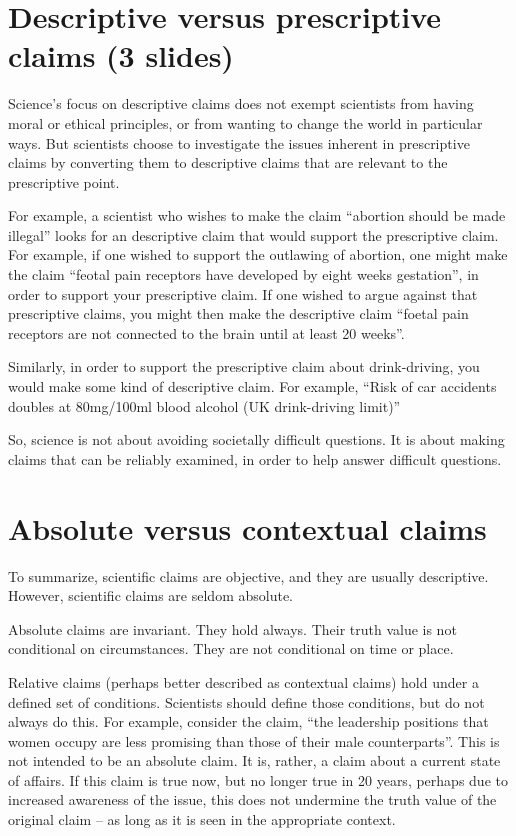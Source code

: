 \documentclass[12pt]{article}
\begin{document}
\section{Descriptive versus prescriptive claims (3 slides)}

Science's focus on descriptive claims does not exempt scientists from
having moral or ethical principles, or from wanting to change the
world in particular ways. But scientists choose to investigate the
issues inherent in prescriptive claims by converting them to
descriptive claims that are relevant to the prescriptive point.

For example, a scientist who wishes to make the claim ``abortion
should be made illegal'' looks for an descriptive claim that would
support the prescriptive claim. For example, if one wished to support
the outlawing of abortion, one might make the claim ``feotal pain
receptors have developed by eight weeks gestation'', in order to
support your prescriptive claim. If one wished to argue against that
prescriptive claims, you might then make the descriptive claim
``foetal pain receptors are not connected to the brain until at least
20 weeks''.

Similarly, in order to support the prescriptive claim about
drink-driving, you would make some kind of descriptive claim. For
example, ``Risk of car accidents doubles at 80mg/100ml blood alcohol
(UK drink-driving limit)''

So, science is not about avoiding societally difficult questions. It
is about making claims that can be reliably examined, in order to help
answer difficult questions.

\section{Absolute versus contextual claims}

To summarize, scientific claims are objective, and they are usually
descriptive. However, scientific claims are seldom absolute.

Absolute claims are invariant. They hold always. Their truth value is
not conditional on circumstances. They are not conditional on time or
place.

Relative claims (perhaps better described as contextual claims) hold
under a defined set of conditions. Scientists should define those
conditions, but do not always do this. For example, consider the
claim, ``the leadership positions that women occupy are less promising
than those of their male counterparts''. This is not intended to be an
absolute claim. It is, rather, a claim about a current state of
affairs. If this claim is true now, but no longer true in 20 years,
perhaps due to increased awareness of the issue, this does not
undermine the truth value of the original claim -- as long as it is
seen in the appropriate context.
\end{document}
